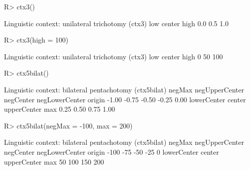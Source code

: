 \begin{Schunk}
% --begin: "ctx"
\begin{Sinput}
R> ctx3()
\end{Sinput}
\begin{Soutput}
Linguistic context: unilateral trichotomy (ctx3)
   low center   high 
   0.0    0.5    1.0 
\end{Soutput}
\begin{Sinput}
R> ctx3(high = 100)
\end{Sinput}
\begin{Soutput}
Linguistic context: unilateral trichotomy (ctx3)
   low center   high 
     0     50    100 
\end{Soutput}
\begin{Sinput}
R> ctx5bilat()
\end{Sinput}
\begin{Soutput}
Linguistic context: bilateral pentachotomy (ctx5bilat)
        negMax negUpperCenter      negCenter negLowerCenter         origin 
         -1.00          -0.75          -0.50          -0.25           0.00 
   lowerCenter         center    upperCenter            max 
          0.25           0.50           0.75           1.00 
\end{Soutput}
\begin{Sinput}
R> ctx5bilat(negMax = -100, max = 200)
\end{Sinput}
\begin{Soutput}
Linguistic context: bilateral pentachotomy (ctx5bilat)
        negMax negUpperCenter      negCenter negLowerCenter         origin 
          -100            -75            -50            -25              0 
   lowerCenter         center    upperCenter            max 
            50            100            150            200 
\end{Soutput}
% --end: "ctx"
\end{Schunk}
